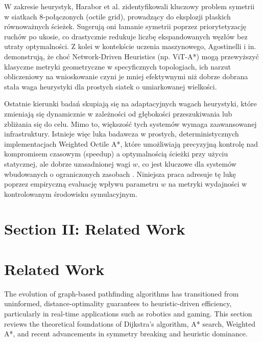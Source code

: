 \documentclass[conference]{IEEEtran}
\begin{document}
W zakresie heurystyk, Harabor et al. \cite{harabor2023octile} zidentyfikowali kluczowy problem symetrii w siatkach 8-połączonych (octile grid), prowadzący do eksplozji płaskich równoważnych ścieżek. Sugerują oni łamanie symetrii poprzez priorytetyzację ruchów po ukosie, co drastycznie redukuje liczbę ekspandowanych węzłów bez utraty optymalności. Z kolei w kontekście uczenia maszynowego, Agostinelli i in. \cite{agostinelli2024learned} demonstrują, że choć Network-Driven Heuristics (np. ViT-A*) mogą przewyższyć klasyczne metryki geometryczne w specyficznych topologiach, ich narzut obliczeniowy na wnioskowanie czyni je mniej efektywnymi niż dobrze dobrana stała waga heurystyki dla prostych siatek o umiarkowanej wielkości.

Ostatnie kierunki badań \cite{chen2024focal, shperberg2024deadline} skupiają się na adaptacyjnych wagach heurystyki, które zmieniają się dynamicznie w zależności od głębokości przeszukiwania lub zbliżania się do celu. Mimo to, większość tych systemów wymaga zaawansowanej infrastruktury. Istnieje więc luka badawcza w prostych, deterministycznych implementacjach Weighted Octile A*, które umożliwiają precyzyjną kontrolę nad kompromisem czasowym (speedup) a optymalnością ścieżki przy użyciu statycznej, ale dobrze uzasadnionej wagi \(w\), co jest kluczowe dla systemów wbudowanych o ograniczonych zasobach \cite{zhang2025hardware}. Niniejsza praca adresuje tę lukę poprzez empiryczną evaluację wpływu parametru \(w\) na metryki wydajności w kontrolowanym środowisku symulacyjnym.

\section{Section II: Related Work}
\section{Related Work}
\label{sec:related_work}

The evolution of graph-based pathfinding algorithms has transitioned from uninformed, distance-optimality guarantees to heuristic-driven efficiency, particularly in real-time applications such as robotics and gaming. This section reviews the theoretical foundations of Dijkstra's algorithm, A* search, Weighted A*, and recent advancements in symmetry breaking and heuristic dominance.
\end{document}
